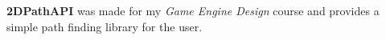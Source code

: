 \label{index_md_2DPathAPI_extradocs_mainpage}%
%
 {\bfseries{2DPath\+API}} was made for my {\itshape Game Engine Design} course and provides a simple path finding library for the user. 